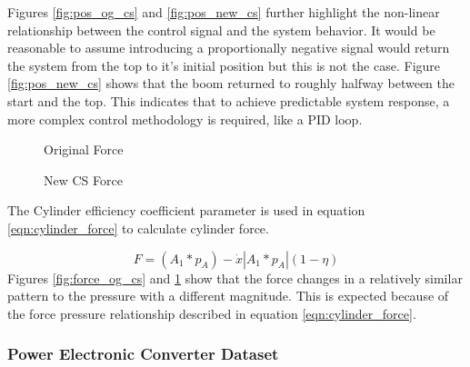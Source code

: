 Figures \ref{fig:pos_og_cs} and \ref{fig:pos_new_cs} further highlight the non-linear relationship between the control signal and the system behavior. It would be reasonable to assume introducing a proportionally negative signal would return the system from the top to it's initial position but this is not the case. Figure \ref{fig:pos_new_cs} shows that the boom returned to roughly halfway between the start and the top. This indicates that to achieve predictable system response, a more complex control methodology is required, like a PID loop.

\begin{figure}[H] \label{ fig-force-mod} 
  \begin{minipage}[b]{0.5\linewidth}
    \caption{Original Force}
    \label{fig:force_og_cs}
  \end{minipage} 
  \begin{minipage}[b]{0.5\linewidth}
    \caption{New CS Force}
    \label{fig:force_new_cs}
  \end{minipage} 
\end{figure}


The Cylinder efficiency coefficient parameter is used in equation \ref{eqn:cylinder_force} to calculate cylinder force.

\begin{equation}
    \label{eqn:cylinder_force}
    F = (A_1 * p_A) - \dot{x}  | A_1 * p_A | (1 - \eta)
\end{equation}
Figures \ref{fig:force_og_cs} and \ref{fig:force_new_cs} show that the force changes in a relatively similar pattern to the pressure with a different magnitude. This is expected because of the force pressure relationship described in equation \ref{eqn:cylinder_force}.

\subsubsection{Power Electronic Converter Dataset}
\label{ref_pec_dataset}

